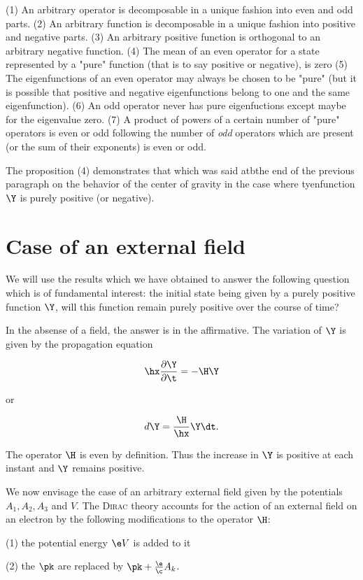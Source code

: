 \documentclass{article}
\newcommand{\uequ}[1]{
\begin{equation*}
#1
\end{equation*}
}
\newcommand{\var}[1]{#1}
\newcommand{\pddt}[1]{\pdXdY{#1}{\t}}
\newcommand{\pdXdY}[2]{
\frac{\partial {#1}}{\partial {#2}}
}
\renewcommand{\it}[1]{\textit{#1}}
\renewcommand{\sc}[1]{\textsc{#1}}
\newcommand{\Ai}[1]{\var{A}_{#1}}
\newcommand{\V}{\var{V}}
\begin{document}
(1) An arbitrary operator is decomposable in a unique fashion into even and odd parts.
(2) An arbitrary function is decomposable in a unique fashion into positive and negative parts.
(3) An arbitrary positive function is orthogonal to an arbitrary negative function.
(4) The mean of an even operator for a state represented by a "pure" function (that is to say positive or negative), is zero
(5) The eigenfunctions of an even operator may always be chosen to be "pure" (but it is possible that positive and negative eigenfunctions belong to one and the same eigenfunction).
(6) An odd operator never has pure eigenfuctions except maybe for the eigenvalue zero.
(7) A product of powers of a certain number of "pure" operators is even or odd following the number of \it{odd} operators which are present (or the sum of their exponents) is even or odd.

The proposition (4) demonstrates that which was said atbthe end of the previous paragraph on the behavior of the center of gravity in the case where tyenfunction $\Y$ is purely positive (or negative).

\section{Case of an external field}

We will use the results which we have obtained to answer the following question which is of fundamental interest: the initial state being given by a purely positive function $\Y$, will this function remain purely positive over the course of time?

In the absense of a field, the answer is in the affirmative. The variation of $\Y$ is given by the propagation equation
\uequ{
\hx\pddt{\Y} = -\H\Y
}
or
\uequ{
d\Y = \frac{\H}{\hx}\Y\dt.
}

The operator $\H$ is even by definition. Thus the increase in $\Y$ is positive at each instant and $\Y$ remains positive.

We now envisage the case of an arbitrary external field given by the potentials $\Ai{1}, \Ai{2}, \Ai{3}$ and $\V$. The \sc{Dirac} theory accounts for the action of an external field on an electron by the following modifications to the operator $\H$:

(1)
the potential energy $\e\V$ is added to it

(2) the $\pk$ are replaced by $\pk + \frac{\e}{\c}\Ai{k}$.
\end{document}
